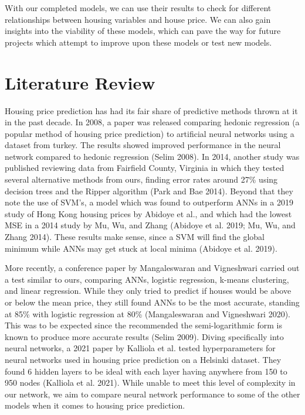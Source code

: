 \documentclass[12pt]{article}
\begin{document}
	With our completed models, we can use their results to check for different relationships between housing variables and house price. We can also gain insights into the viability of these models, which can pave the way for future projects which attempt to improve upon these models or test new models.
	
	\section{Literature Review}
		
	Housing price prediction has had its fair share of predictive methods thrown at it in the past decade. In 2008, a paper was released comparing hedonic regression (a popular method of housing price prediction) to artificial neural networks using a dataset from turkey. The results showed improved performance in the neural network compared to hedonic regression (Selim 2008). In 2014, another study was published reviewing data from Fairfield County, Virginia in which they tested several alternative methods from ours, finding error rates around 27\% using decision trees and the Ripper algorithm (Park and Bae 2014). Beyond that they note the use of SVM’s, a model which was found to outperform ANNs in a 2019 study of Hong Kong housing prices by Abidoye et al., and which had the lowest MSE in a 2014 study by Mu, Wu, and Zhang (Abidoye et al. 2019; Mu, Wu, and Zhang 2014). These results make sense, since a SVM will find the global minimum while ANNs may get stuck at local minima (Abidoye et al. 2019).
	
	More recently, a conference paper by Mangaleswaran and Vigneshwari carried out a test similar to ours, comparing ANNs, logistic regression, k-means clustering, and linear regression. While they only tried to predict if houses would be above or below the mean price, they still found ANNs to be the most accurate, standing at 85\% with logistic regression at 80\% (Mangaleswaran and Vigneshwari 2020). This was to be expected since the recommended the semi-logarithmic form is known to produce more accurate results (Selim 2009). Diving specifically into neural networks, a 2021 paper by Kalliola et al. tested hyperparameters for neural networks used in housing price prediction on a Helsinki dataset. They found 6 hidden layers to be ideal with each layer having anywhere from 150 to 950 nodes (Kalliola et al. 2021). While unable to meet this level of complexity in our network, we aim to compare neural network performance to some of the other models when it comes to housing price prediction.
	
\end{document}
